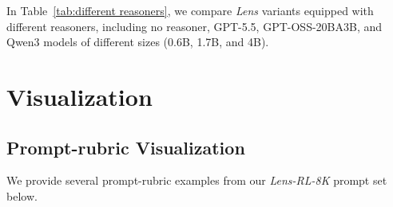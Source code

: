 In Table~\ref{tab:different reasoners}, we compare \textit{Lens} variants equipped with different reasoners, including no reasoner, GPT-5.5, GPT-OSS-20BA3B, and Qwen3 models of different sizes (0.6B, 1.7B, and 4B).


\section{Visualization}
\label{sec:visualization-appendix}


\subsection{Prompt-rubric Visualization}
\label{vis:rubric}
We provide several prompt-rubric examples from our \textit{Lens-RL-8K} prompt set below.


